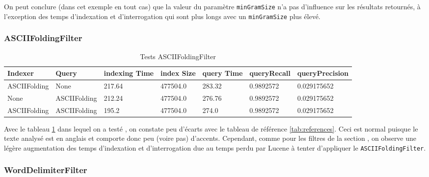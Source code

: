 On peut conclure (dans cet exemple en tout cas) que la valeur du paramètre \texttt{minGramSize} n’a pas d'influence sur les résultats retournés, à l’exception des temps d’indexation et d’interrogation qui sont plus longs avec un \texttt{minGramSize} plus élevé.

\subsubsection{ASCIIFoldingFilter}

\begin{table}[!htbp]
    \hspace{-2cm}
                \begin{tabular}{|p{2cm}|p{2cm}|p{2cm}|p{2cm}|p{2.5cm}|p{2.5cm}|p{2.5cm}|}
                    \hline
                    \textbf{Indexer} & \textbf{Query} & \textbf{indexing Time} & \textbf{index Size} & \textbf{query Time} & \textbf{queryRecall} & \textbf{queryPrecision}\\
                    \hline
ASCIIFolding & None & 217.64 & 477504.0 & 283.32 & 0.9892572 & 0.029175652\\
		\hline
None & ASCIIFolding & 212.24 & 477504.0 & 276.76 & 0.9892572 & 0.029175652\\
		\hline
ASCIIFolding & ASCIIFolding & 195.2 & 477504.0 & 274.0 & 0.9892572 & 0.029175652\\
                    \hline
                \end{tabular}
                \caption{Tests ASCIIFoldingFilter}
                \label{tab:tests_ASCIIFoldingFilter}
            \end{table}

Avec le tableau \ref{tab:tests_ASCIIFoldingFilter} dans lequel on a testé , on constate peu d’écarts avec le tableau de référence \ref{tab:references}. Ceci est normal puisque le texte analysé est en anglais et comporte donc peu (voire pas) d’accents. Cependant, comme pour les filtres de la section \label{section:filtrespourris}, on observe une légère augmentation des temps d’indexation et d’interrogation due au temps perdu par Lucene à tenter d’appliquer le \texttt{ASCIIFoldingFilter}.

\subsubsection{WordDelimiterFilter}

